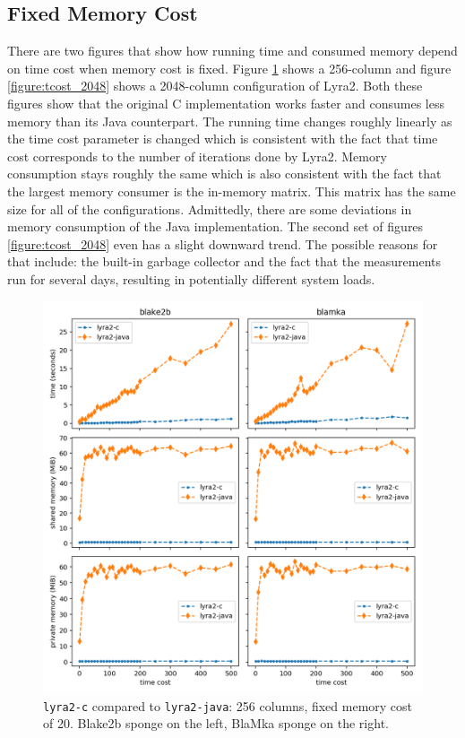 \subsection{Fixed Memory Cost}
\label{sec:fixed-memory-cost}

There are two figures that show how running time and consumed memory depend on time cost when memory cost is fixed. Figure \ref{figure:tcost_256} shows a 256-column and figure \ref{figure:tcost_2048} shows a 2048-column configuration of Lyra2. Both these figures show that the original C implementation works faster and consumes less memory than its Java counterpart. The running time changes roughly linearly as the time cost parameter is changed which is consistent with the fact that time cost corresponds to the number of iterations done by Lyra2. Memory consumption stays roughly the same which is also consistent with the fact that the largest memory consumer is the in-memory matrix. This matrix has the same size for all of the configurations. Admittedly, there are some deviations in memory consumption of the Java implementation. The second set of figures \ref{figure:tcost_2048} even has a slight downward trend. The possible reasons for that include: the built-in garbage collector and the fact that the measurements run for several days, resulting in potentially different system loads.

\begin{figure}[H]
    \centering
    \includegraphics[width=\linewidth,keepaspectratio]{figures/tcost_256}
    \caption{\texttt{lyra2-c} compared to \texttt{lyra2-java}: 256 columns, fixed memory cost of 20. Blake2b sponge on the left, BlaMka sponge on the right.}
    \label{figure:tcost_256}
\end{figure}

